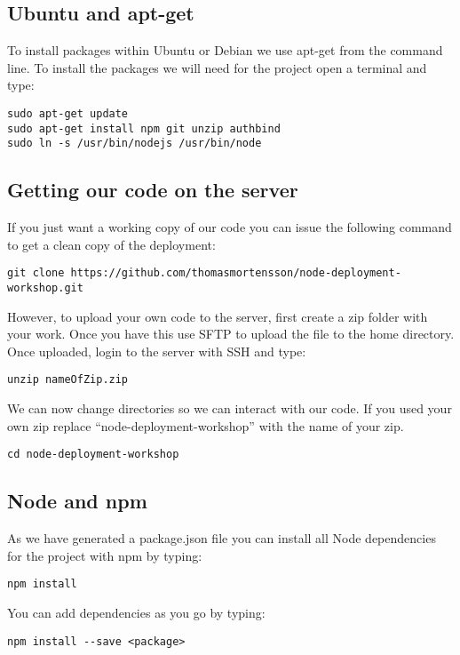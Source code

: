 \documentclass[twocolumn]{article}
\begin{document}
\subsection{Ubuntu and apt-get}

To install packages within Ubuntu or Debian we use apt-get from the command line. To install the packages we will need for the project open a terminal and type:
\begin{lstlisting}
sudo apt-get update
sudo apt-get install npm git unzip authbind
sudo ln -s /usr/bin/nodejs /usr/bin/node
\end{lstlisting}

\subsection{Getting our code on the server}

If you just want a working copy of our code you can issue the following command to get a clean copy of the deployment:
\begin{lstlisting}
git clone https://github.com/thomasmortensson/node-deployment-workshop.git
\end{lstlisting}

However, to upload your own code to the server, first create a zip folder with your work. Once you have this use SFTP to upload the file to the home directory. Once uploaded, login to the server with SSH and type:
\begin{lstlisting}
unzip nameOfZip.zip
\end{lstlisting}
We can now change directories so we can interact with our code. If you used your own zip replace ``node-deployment-workshop'' with the name of your zip.
\begin{lstlisting}
cd node-deployment-workshop
\end{lstlisting}

\subsection{Node and npm}

As we have generated a package.json file you can install all Node dependencies for the project with npm by typing:
\begin{lstlisting}
npm install
\end{lstlisting}

You can add dependencies as you go by typing:
\begin{lstlisting}
npm install --save <package>
\end{lstlisting}
\end{document}
